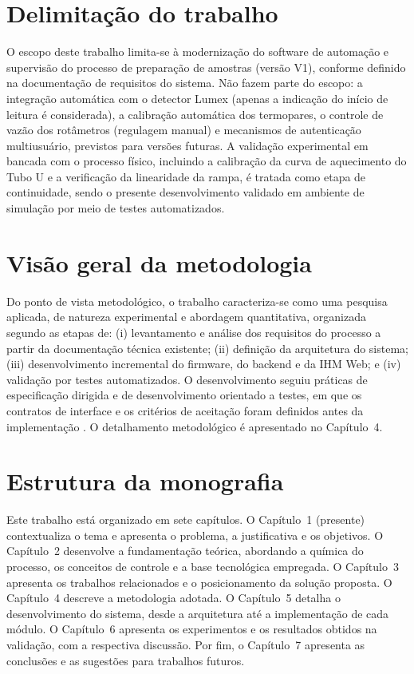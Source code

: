 \section{Delimitação do trabalho}

O escopo deste trabalho limita-se à modernização do software de automação e
supervisão do processo de preparação de amostras (versão V1), conforme definido
na documentação de requisitos do sistema. Não fazem parte do
escopo: a integração automática com o detector Lumex (apenas a indicação do
início de leitura é considerada), a calibração automática dos termopares, o
controle de vazão dos rotâmetros (regulagem manual) e mecanismos de
autenticação multiusuário, previstos para versões futuras. A validação
experimental em bancada com o processo físico, incluindo a calibração da curva
de aquecimento do Tubo U e a verificação da linearidade da rampa, é tratada como
etapa de continuidade, sendo o presente desenvolvimento validado em ambiente de
simulação por meio de testes automatizados.

\section{Visão geral da metodologia}

Do ponto de vista metodológico, o trabalho caracteriza-se como uma pesquisa
aplicada, de natureza experimental e abordagem quantitativa, organizada segundo
as etapas de: (i) levantamento e análise dos requisitos do processo a partir da
documentação técnica existente; (ii) definição da arquitetura do sistema; (iii)
desenvolvimento incremental do firmware, do backend e da IHM Web; e (iv)
validação por testes automatizados. O desenvolvimento seguiu práticas de
especificação dirigida e de desenvolvimento orientado a testes, em que os
contratos de interface e os critérios de aceitação foram definidos antes da
implementação \cite{beck2002}. O detalhamento metodológico é
apresentado no Capítulo~4.

\section{Estrutura da monografia}

Este trabalho está organizado em sete capítulos. O Capítulo~1 (presente)
contextualiza o tema e apresenta o problema, a justificativa e os objetivos. O
Capítulo~2 desenvolve a fundamentação teórica, abordando a química do processo,
os conceitos de controle e a base tecnológica empregada. O Capítulo~3 apresenta
os trabalhos relacionados e o posicionamento da solução proposta. O Capítulo~4
descreve a metodologia adotada. O Capítulo~5 detalha o desenvolvimento do
sistema, desde a arquitetura até a implementação de cada módulo. O Capítulo~6
apresenta os experimentos e os resultados obtidos na validação, com a respectiva
discussão. Por fim, o Capítulo~7 apresenta as conclusões e as sugestões para
trabalhos futuros.
